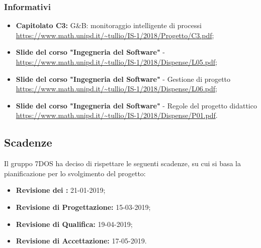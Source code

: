 \subsubsection{Informativi}
\begin{itemize}	
	\item \textbf{Capitolato C3:} G\&B: monitoraggio intelligente di processi 
 \\ \url{https://www.math.unipd.it/~tullio/IS-1/2018/Progetto/C3.pdf};
 	\item \textbf{Slide del corso "Ingegneria del Software"} - 
 \\ \url{https://www.math.unipd.it/~tullio/IS-1/2018/Dispense/L05.pdf};
	\item \textbf{Slide del corso "Ingegneria del Software"} - Gestione di progetto
 \\ \url{https://www.math.unipd.it/~tullio/IS-1/2018/Dispense/L06.pdf};
 	\item \textbf{Slide del corso "Ingegneria del Software"} - Regole del progetto didattico
 \\ \url{https://www.math.unipd.it/~tullio/IS-1/2018/Dispense/P01.pdf}.
 
\end{itemize}

\subsection{Scadenze}
Il gruppo 7DOS ha deciso di rispettare le seguenti scadenze, su cui si basa la pianificazione per lo svolgimento del progetto:
\begin{itemize}
	\item \textbf{Revisione dei :} 21-01-2019;
	\item \textbf{Revisione di Progettazione:} 15-03-2019;
	\item \textbf{Revisione di Qualifica:} 19-04-2019;
	\item \textbf{Revisione di Accettazione:} 17-05-2019.
\end{itemize}

\pagebreak
